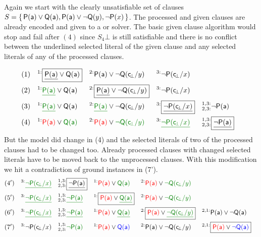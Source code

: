 \begin{example}\label{ex:given:clause:algorithm:with:inst:gen}
	Again we start with the clearly unsatisfiable set of clauses
\( S=\{ \, \mathsf{P}(\mathsf{a})\lor\mathsf{Q}(\mathsf{a}), \mathsf{P}(\mathsf{a})\lor\lnot\mathsf{Q}(y), \lnot\mathsf{P}(x) \, \} \).
	The processed and given clauses are already encoded and
	given to a \SAT{} or \SMT{} solver.
	The basic given clause algorithm would stop and fail after \( (4) \)
	since \( S_4\bot \) is still satisfiable and there is no conflict between the underlined selected literal of the given clause
	and any selected literals of any of the processed clauses.

	\begin{align*}
	(1)\quad^{1:}&\boxed{\underline{\mP(\ma)}\lor\mQ(\ma)}
	& ^{2:}&\mP(\ma)\lor\lnot\mQ(\consbot/y)
	& ^{3:}&\lnot\mP(\consbot/x)
	\\
	(2)\quad^{1:}&{\colHi\underline{\mP(\ma)}}\lor\mQ(\ma)
	& ^{2:}&\boxed{\underline{\mP(\ma)}\lor\lnot\mQ(\consbot/y)}
	& ^{3:}&\lnot\mP(\consbot/x)
	\\
	(3)\quad^{1:}&{\colHi\underline{\mP(\ma)}}\lor\mQ(\ma)
	& ^{2:}&{\colHi\underline{\mP(\ma)}}\lor\lnot\mQ(\consbot/y)
	& ^{3:}&\boxed{\underline{\lnot\mP(\consbot/x)}}
	& ^{1,3:}_{2,3:}&\lnot\mP(\ma)
	\\
	(4)\quad
	^{1:}&{\colLo\mP(\ma)}\lor\colHi\mQ(\ma)
	& ^{2:}&{\colLo\mP(\ma)}\lor\colHi\lnot\mQ(\consbot/y)
	& ^{3:}&{\colHi\underline{\lnot\mP(\consbot/x)}}
	& ^{1,3:}_{2,3:}&\boxed{\underline{\lnot\mP(\ma)}}
	\end{align*}
	But the model did change in (4) and the selected literals of two of the processed clauses had to be changed too.
	Already processed clauses with changed selected literals have to be moved back to the unprocessed clauses.
	With this modification we hit a contradiction of ground instances in (7').
	\begin{align*}
	(4')\quad^{3:}&{\underline{\colHi\lnot\mP(\consbot/x)}}
	& ^{1,3:}_{2,3:}&\boxed{\underline{\lnot\mP(\ma)}}
	& ^{1:}&{\colLo\mP(\ma)}\lor\colHi\mQ(\ma)
	& ^{2:}&{\colLo\mP(\ma)}\lor\colHi\lnot\mQ(\consbot/y)
	\\
	(5')\quad^{3:}&{\underline{\colHi\lnot\mP(\consbot/x)}}
	& ^{1,3:}_{2,3:}&\colHi\underline{\lnot\mP(\ma)}
	& ^{1:}&\boxed{{\colLo\mP(\ma)}\lor\colHi\underline{\mQ(\ma)}}
	& ^{2:}&{\colLo\mP(\ma)}\lor\colHi\lnot\mQ(\consbot/y)
	\\
	(6')\quad^{3:}&{\colHi\underline{\lnot\mP(\consbot/x)}}
	& ^{1,3:}_{2,3:}&\colHi\underline{\lnot\mP(\ma)}
	& ^{1:}&{\colLo\mP(\ma)}\lor\colHi\underline{\mQ(\ma)}
	& ^{2:}&\boxed{{\colLo\mP(\ma)}\lor\colHi\underline{\lnot\mQ(\consbot/y)}}
	& ^{2,1:}&\mP(\ma)\lor\lnot\mQ(\ma)
	\\
	(7')\quad^{3:}&{\lnot\mP(\consbot/x)}
	& ^{1,3:}_{2,3:}&\colHi\lnot\mP(\tikzmark{NP}\ma)
	& ^{1:}&{\colLo\mP(\tikzmark{PP}\ma)}\lor\colN\mQ(\tikzmark{PQ}\ma)
	& ^{2:}&{\mP(\ma)\lor\lnot\mQ(\consbot/y)}
	& ^{2,1:}&\boxed{{\colLo\mP(\tikzmark{PA}\ma)}\lor\colN\lnot\mQ(\tikzmark{NQ}\ma)}
	\end{align*}


\end{example}
